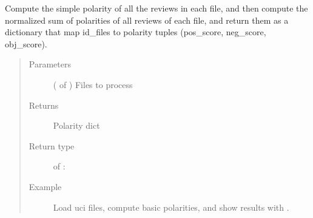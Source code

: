 \documentclass[letterpaper,10pt,english]{sphinxmanual}
\begin{document}
\begin{fulllineitems}
\label{\detokenize{analysis:loacore.analysis.sentiment_analysis.compute_simple_files_polarity}}
Compute the simple polarity of all the reviews in each file, and then compute the normalized sum of polarities of
all reviews of each file, and return them as a dictionary that map id\_files to polarity tuples (pos\_score,
neg\_score, obj\_score).
\begin{quote}\begin{description}
\item[{Parameters}] \leavevmode
{} ( of {\hyperref[\detokenize{classes:loacore.classes.classes.File}]{}}) \textendash{} Files to process

\item[{Returns}] \leavevmode
Polarity dict

\item[{Return type}] \leavevmode
{} of  : 

\item[{Example}] \leavevmode
Load uci files, compute basic polarities, and show results with .


\end{description}
\end{quote}
\end{fulllineitems}
\end{document}
